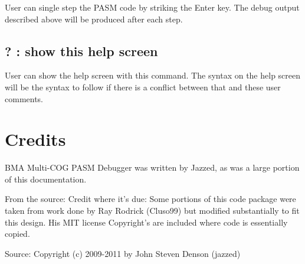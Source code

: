 \documentclass{article}
\numberwithin{equation}{section} %
\begin{document}
User can single step the PASM code by striking the Enter key. The debug output described
above will be produced after each step.


\subsection{?      : show this help screen}

User can show the help screen with this command. The syntax on the help screen will be
the syntax to follow if there is a conflict between that and these user comments.




\section{Credits}
BMA Multi-COG PASM Debugger was written by Jazzed, as was a large portion of this documentation.

From the source: Credit where it's due: Some portions of this code package were taken from work
done by Ray Rodrick (Cluso99) but modified substantially to fit this design.
His MIT license Copyright's are included where code is essentially copied. 


Source: Copyright (c) 2009-2011 by John Steven Denson (jazzed)
\end{document}
